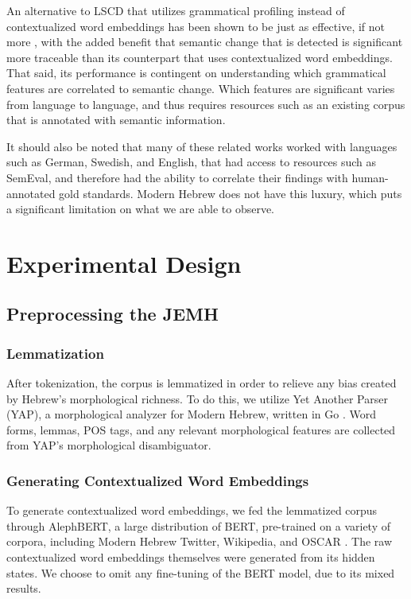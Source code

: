 \documentclass[10pt, a4paper]{article}
\begin{document}
An alternative to LSCD that utilizes grammatical profiling instead of contextualized word embeddings has been shown to be just as effective, if not more \cite{grammaticalprofiling}, with the added benefit that semantic change that is detected is significant more traceable than its counterpart that uses contextualized word embeddings. That said, its performance is contingent on understanding which grammatical features are correlated to semantic change. Which features are significant varies from language to language, and thus requires resources such as an existing corpus that is annotated with semantic information.

It should also be noted that many of these related works worked with languages such as German, Swedish, and English, that had access to resources such as SemEval, and therefore had the ability to correlate their findings with human-annotated gold standards. Modern Hebrew does not have this luxury, which puts a significant limitation on what we are able to observe.
\section{Experimental Design}

\subsection{Preprocessing the JEMH}

\subsubsection{Lemmatization}
After tokenization, the corpus is lemmatized in order to relieve any bias created by Hebrew's morphological richness. To do this, we utilize Yet Another Parser (YAP), a morphological analyzer for Modern Hebrew, written in Go \cite{yap}. Word forms, lemmas, POS tags, and any relevant morphological features are collected from YAP's morphological disambiguator. 
\subsubsection{Generating Contextualized Word Embeddings}
To generate contextualized word embeddings, we fed the lemmatized corpus through AlephBERT, a large distribution of BERT, pre-trained on a variety of corpora, including Modern Hebrew Twitter, Wikipedia, and OSCAR \cite{alephBERT}. The raw contextualized word embeddings themselves were generated from its hidden states. We choose to omit any fine-tuning of the BERT model, due to its mixed results.
\end{document}
